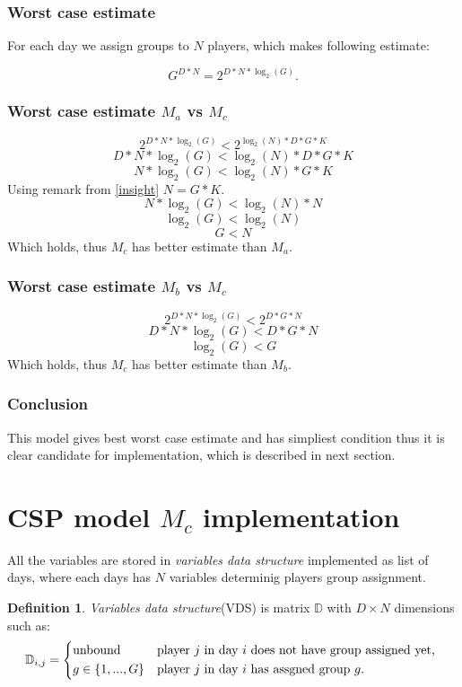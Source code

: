 \documentclass[a4paper]{article}
\theoremstyle{definition}
\newtheorem{definition}{Definition}[section]
\theoremstyle{remark}
\newcommand{\mdef}[2]{
	\theoremstyle{definition}
	\begin{definition}{#1}
	#2
	\end{definition}
}
\begin{document}
\subsubsection{Worst case estimate}
For each day we assign groups to  $N$ players, which makes following estimate:

$$ G^{D*N} = 2^{D*N*\log_2(G)}.$$

\subsubsection{Worst case estimate $M_a$ vs $M_c$}
$$ 2^{D*N*\log_2(G)} < 2^{\log_2{(N)}*D*G*K}$$
$$ D*N*\log_2(G) < \log_2{(N)}*D*G*K $$
$$ N*\log_2(G) < \log_2{(N)}*G*K $$
Using remark from \ref{insight} $N = G*K$.
$$ N*\log_2(G) < \log_2{(N)}*N $$
$$ \log_2(G) < \log_2{(N)} $$
$$ G < N $$
Which holds, thus $M_c$ has better estimate than $M_a$.


\subsubsection{Worst case estimate $M_b$ vs $M_c$}
$$ 2^{D*N*\log_2(G)} < 2^{D*G*N}$$
$$ D*N*\log_2(G) < D*G*N$$
$$ \log_2(G) < G$$
Which holds, thus $M_c$ has better estimate than $M_b$.


\subsubsection{Conclusion}
This model gives best worst case estimate and has simpliest condition thus 
it is clear candidate for implementation, which is described in next section.

\section{CSP model $M_c$ implementation}
All the variables are stored in \textit{variables data structure} implemented as list
of days, where each days has $N$ variables determinig players group assignment.

\mdef{}{
\textit{Variables data structure}(VDS) is matrix $\mathbb{D}$ with $D \times N$ dimensions such as:
\begin{equation}
	\mathbb{D}_{i,j} = 
	\begin{cases*}
		\text{unbound}	& player $j$ in day $i$ does not have group assigned yet, \\
		g \in \{1,...,G\}        & player $j$ in day $i$ has assgned group $g$. 
	\end{cases*}
\end{equation}
}
\end{document}
